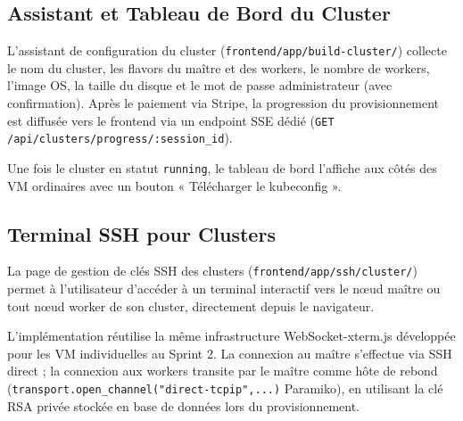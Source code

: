 \subsection{Assistant et Tableau de Bord du Cluster}

L'assistant de configuration du cluster (\texttt{frontend/app/build-cluster/}) collecte
le nom du cluster, les flavors du maître et des workers, le nombre de workers, l'image
OS, la taille du disque et le mot de passe administrateur (avec confirmation). Après le
paiement via Stripe, la progression du provisionnement est diffusée vers le frontend
via un endpoint SSE dédié (\texttt{GET /api/clusters/progress/:session\_id}).



Une fois le cluster en statut \texttt{running}, le tableau de bord l'affiche aux côtés
des VM ordinaires avec un bouton « Télécharger le kubeconfig ».


\subsection{Terminal SSH pour Clusters}

La page de gestion de clés SSH des clusters (\texttt{frontend/app/ssh/cluster/})
permet à l'utilisateur d'accéder à un terminal interactif vers le nœud maître ou
tout nœud worker de son cluster, directement depuis le navigateur.

L'implémentation réutilise la même infrastructure WebSocket-xterm.js développée
pour les VM individuelles au Sprint 2. La connexion au maître s'effectue via SSH
direct ; la connexion aux workers transite par le maître comme hôte de rebond
(\texttt{transport.open\_channel("direct-tcpip",...)} Paramiko), en utilisant la
clé RSA privée stockée en base de données lors du provisionnement.


